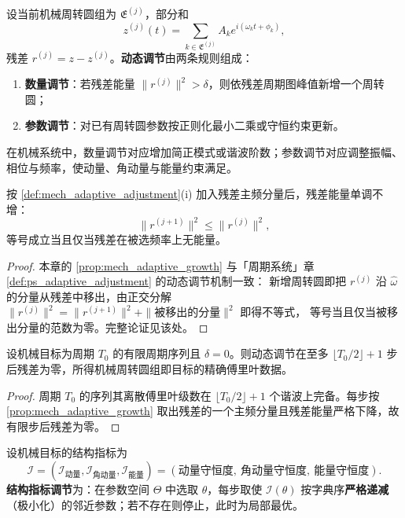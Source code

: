 \begin{definition}[机械周转圆组的动态调节]\label{def:mech_adaptive_adjustment}
设当前机械周转圆组为 $\mathfrak E^{(j)}$，部分和
\[
z^{(j)}(t)=\sum_{k\in\mathfrak E^{(j)}}A_k e^{i(\omega_k t+\phi_k)},
\]
残差 $r^{(j)}=z-z^{(j)}$。\textbf{动态调节}由两条规则组成：
\begin{enumerate}[label=(\roman*)]
    \item \textbf{数量调节}：若残差能量 $\|r^{(j)}\|^2>\delta$，则依残差周期图峰值新增一个周转圆；
    \item \textbf{参数调节}：对已有周转圆参数按正则化最小二乘或守恒约束更新。
\end{enumerate}
在机械系统中，数量调节对应增加简正模式或谐波阶数；参数调节对应调整振幅、相位与频率，使动量、角动量与能量约束满足。
\end{definition}

\begin{proposition}[数量调节的单调性]\label{prop:mech_adaptive_growth}
按 \cref{def:mech_adaptive_adjustment}(i) 加入残差主频分量后，残差能量单调不增：
\[
\|r^{(j+1)}\|^2\le\|r^{(j)}\|^2,
\]
等号成立当且仅当残差在被选频率上无能量。
\end{proposition}

\begin{proof}
本章的 \cref{prop:mech_adaptive_growth} 与「周期系统」章 \cref{def:ps_adaptive_adjustment} 的动态调节机制一致：
新增周转圆即把 $r^{(j)}$ 沿 $\hat\omega$ 的分量从残差中移出，由正交分解
$\|r^{(j)}\|^2=\|r^{(j+1)}\|^2+\|\text{被移出的分量}\|^2$ 即得不等式，
等号当且仅当被移出分量的范数为零。完整论证见该处。
\end{proof}

\begin{theorem}[动态调节的收敛性]\label{thm:mech_adaptive_convergence}
设机械目标为周期 $T_0$ 的有限周期序列且 $\delta=0$。则动态调节在至多 $\lfloor T_0/2\rfloor+1$ 步后残差为零，所得机械周转圆组即目标的精确傅里叶数据。
\end{theorem}

\begin{proof}
周期 $T_0$ 的序列其离散傅里叶级数在 $\lfloor T_0/2\rfloor+1$ 个谐波上完备。每步按 \cref{prop:mech_adaptive_growth} 取出残差的一个主频分量且残差能量严格下降，故有限步后残差为零。
\end{proof}

\begin{definition}[结构指标调节]\label{def:mech_structure_metric_adjustment}
设机械目标的结构指标为
\[
\mathcal I=(\mathcal I_{\text{动量}},\mathcal I_{\text{角动量}},\mathcal I_{\text{能量}})
=(\text{动量守恒度},\ \text{角动量守恒度},\ \text{能量守恒度}).
\]
\textbf{结构指标调节}为：在参数空间 $\Theta$ 中选取 $\theta$，每步取使 $\mathcal I(\theta)$ 按字典序\textbf{严格递减}（极小化）的邻近参数；若不存在则停止，此时为局部最优。
\end{definition}

